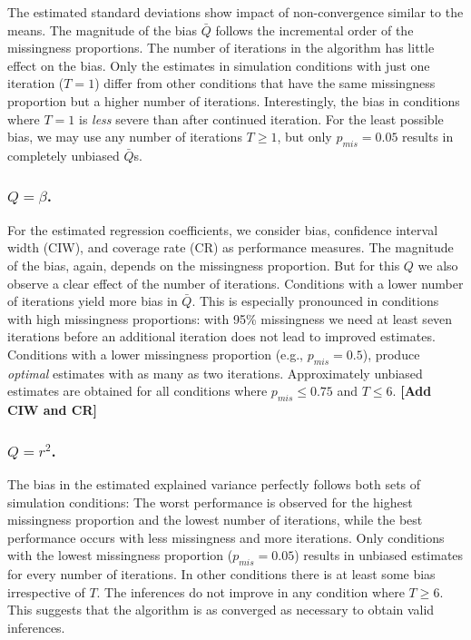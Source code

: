 \documentclass[Royal,times,sageh]{sagej}
\begin{document}
The estimated standard deviations show impact of non-convergence similar to the means. The magnitude of the bias \(\bar{Q}\) follows the incremental order of the missingness proportions. The number of iterations in the algorithm has little effect on the bias. Only the estimates in simulation conditions with just one iteration (\(T=1\)) differ from other conditions that have the same missingness proportion but a higher number of iterations. Interestingly, the bias in conditions where \(T=1\) is \emph{less} severe than after continued iteration. For the least possible bias, we may use any number of iterations \(T\geq1\), but only \(p_{mis} = 0.05\) results in completely unbiased \(\bar{Q}\)s.

\hypertarget{qbeta.}{%
\subsubsection{\texorpdfstring{\(Q=\beta\).}{Q=\textbackslash beta.}}\label{qbeta.}}

For the estimated regression coefficients, we consider bias, confidence interval width (CIW), and coverage rate (CR) as performance measures. The magnitude of the bias, again, depends on the missingness proportion. But for this \(Q\) we also observe a clear effect of the number of iterations. Conditions with a lower number of iterations yield more bias in \(\bar{Q}\). This is especially pronounced in conditions with high missingness proportions: with 95\% missingness we need at least seven iterations before an additional iteration does not lead to improved estimates. Conditions with a lower missingness proportion (e.g., \(p_{mis} = {0.5}\)), produce \emph{optimal} estimates with as many as two iterations. Approximately unbiased estimates are obtained for all conditions where \(p_{mis}\leq0.75\) and \(T\leq6\). \textbf{{[}Add CIW and CR{]}}

\hypertarget{qr2.}{%
\subsubsection{\texorpdfstring{\(Q=r^2\).}{Q=r\^{}2.}}\label{qr2.}}

The bias in the estimated explained variance perfectly follows both sets of simulation conditions: The worst performance is observed for the highest missingness proportion and the lowest number of iterations, while the best performance occurs with less missingness and more iterations. Only conditions with the lowest missingness proportion (\(p_{mis}=0.05\)) results in unbiased estimates for every number of iterations. In other conditions there is at least some bias irrespective of \(T\). The inferences do not improve in any condition where \(T \geq 6\). This suggests that the algorithm is as converged as necessary to obtain valid inferences.
\end{document}
